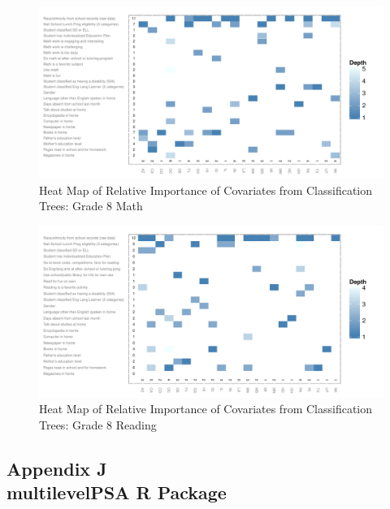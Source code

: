\documentclass[letterpaper,12p,twoside]{article} %
\begin{document}
\begin{figure}[h!]
\begin{center}
\includegraphics[height=.37\textheight]{../Figures2009/g8math-mlpsa-ctree-heat.pdf}
\caption{Heat Map of Relative Importance of Covariates from Classification Trees: Grade 8 Math}
\label{fig:g8math-mlpsa-ctree-heat}
\end{center}
\end{figure}

\begin{figure}[h!]
\begin{center}
\includegraphics[height=.37\textheight]{../Figures2009/g8read-mlpsa-ctree-heat.pdf}
\caption{Heat Map of Relative Importance of Covariates from Classification Trees: Grade 8 Reading}
\label{fig:g8read-mlpsa-ctree-heat}
\end{center}
\end{figure}


\clearpage
{}
\subsection*{Appendix J\\multilevelPSA R Package}
\label{multilevelPSAPackage}
\end{document}
